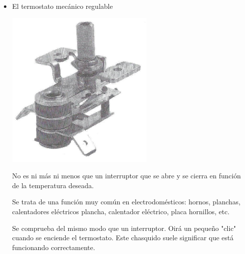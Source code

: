 \documentclass[a5paper,twoside,openany]{book}
\begin{document}
\begin{itemize}

\item El termostato mecánico regulable

\noindent\begin{minipage}[t]{0.45\textwidth}\vspace{0pt}
\includegraphics[width=\linewidth]{termostato}
\end{minipage}
\hfill%
\begin{minipage}[t]{0.5\textwidth}\vspace{\fill}
\vspace{\fill}
No es ni más ni menos que un interruptor
que se abre y se cierra en función de la
temperatura deseada.

Se trata de una función muy común en
electrodomésticos: hornos, planchas, calentadores eléctricos
plancha, calentador eléctrico, placa
hornillos, etc.

Se comprueba del mismo modo que un interruptor.
Oirá un pequeño "clic" cuando se enciende el termostato. Este chasquido suele significar que está funcionando correctamente.\\
\vspace{\fill}
\end{minipage}
\vspace{1em}
\\


\end{itemize}
\end{document}
